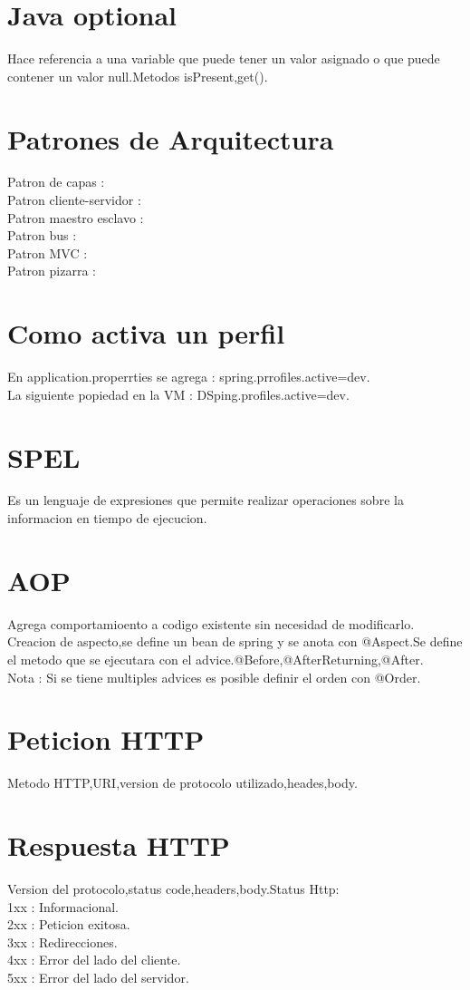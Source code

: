 \section{Java optional}
Hace referencia a una variable  que puede tener un valor asignado o que puede contener un valor
 null.Metodos isPresent,get().
\section{Patrones de Arquitectura}
Patron de capas : \\
Patron cliente-servidor : \\
Patron maestro esclavo : \\
Patron bus : \\
Patron MVC : \\
Patron pizarra : 
\section{Como activa un perfil}
En application.properrties se agrega : spring.prrofiles.active=dev.\\
La siguiente popiedad en la VM : DSping.profiles.active=dev.
\section{SPEL}
Es un lenguaje de expresiones que permite realizar operaciones sobre la informacion en
tiempo de ejecucion.
\section{AOP}
Agrega comportamioento a codigo existente sin necesidad de modificarlo.\\
Creacion de aspecto,se define un bean de spring y se anota con @Aspect.Se define
el metodo que se ejecutara con el advice.@Before,@AfterReturning,@After.\\
Nota : Si se tiene multiples advices es posible definir el orden con @Order.
\section{Peticion HTTP}
Metodo HTTP,URI,version de protocolo utilizado,heades,body.
\section{Respuesta HTTP}
Version del protocolo,status code,headers,body.Status Http:\\
1xx : Informacional.\\
2xx : Peticion exitosa.\\
3xx : Redirecciones.\\
4xx : Error del lado del cliente.\\
5xx : Error del lado del servidor. 
